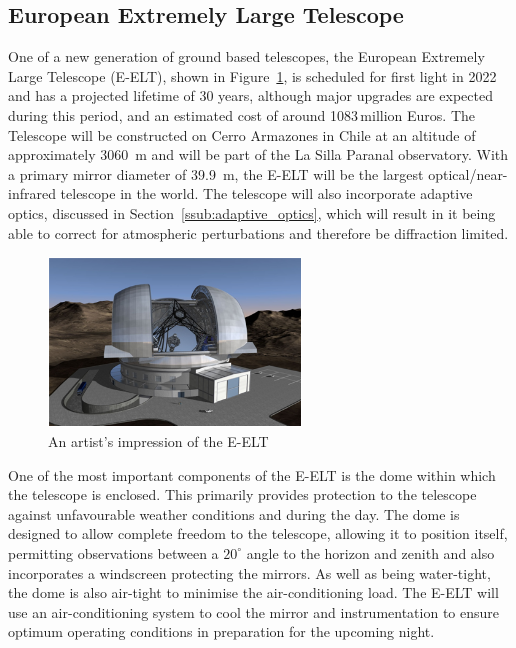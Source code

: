 
\subsection{European Extremely Large Telescope} %
\label{sub:european_extremely_large_telescope}
	One of a new generation of ground based telescopes, the European Extremely Large Telescope (E-ELT), shown in Figure~\ref{fig:artist_eelt}, is scheduled for first light in 2022 and has a projected lifetime of 30 years, although major upgrades are expected during this period\cite[p.~163]{E_ELT_Construction_Proposal}, and an estimated cost of around 1083\,million Euros. The Telescope will be constructed on Cerro Armazones in Chile at an altitude of approximately \SI{3060}{\metre} and will be part of the La Silla Paranal observatory. With a primary mirror diameter of \SI{39.9}{\metre}, the E-ELT will be the largest optical/near-infrared telescope in the world. The telescope will also incorporate adaptive optics, discussed in Section~\ref{ssub:adaptive_optics}, which will result in it being able to correct for atmospheric perturbations and therefore be diffraction limited.
	\begin{figure}[htbp]
		\centering
		\includegraphics[width=0.6\textwidth]{../Images/E-ELT.png}
		\caption{An artist's impression of the E-ELT\cite{E_ELT_Enclosure}}\label{fig:artist_eelt}
	\end{figure}

	One of the most important components of the E-ELT is the dome within which the telescope is enclosed. This primarily provides protection to the telescope against unfavourable weather conditions and during the day. The dome is designed to allow complete freedom to the telescope, allowing it to position itself, permitting observations between a $20^{\circ}$ angle to the horizon and zenith and also incorporates a windscreen protecting the mirrors. As well as being water-tight, the dome is also air-tight to minimise the air-conditioning load. The E-ELT will use an air-conditioning system to cool the mirror and instrumentation to ensure optimum operating conditions in preparation for the upcoming night.


